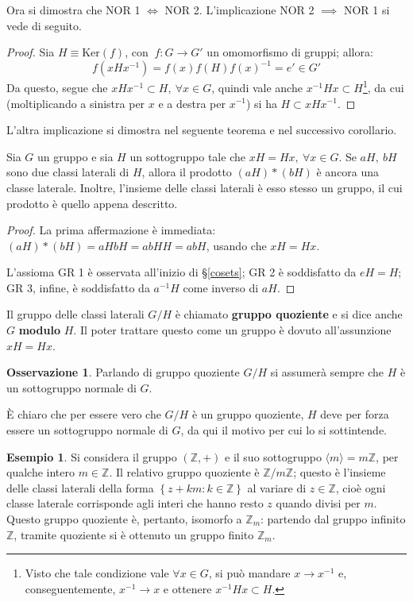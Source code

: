 \documentclass[11pt, a4paper]{scrartcl}
\theoremstyle{definition}
\newtheorem{esempio}{Esempio}
\numberwithin{esempio}{section}
\theoremstyle{definition}
\newtheorem{obs}{Osservazione}
\numberwithin{obs}{section}
\numberwithin{nota}{section}
\numberwithin{equation}{subsection}
\begin{document}
Ora si dimostra che NOR 1 $\iff$ NOR 2. L'implicazione NOR 2 $\implies$ NOR 1 si vede di seguito.
\begin{proof}
	Sia $H\equiv \mathrm{Ker} (f)$, con $ \ f: G \to G'$ un omomorfismo di gruppi; allora:
	\[
	f(xHx^{-1} ) = f(x) f(H) f(x) ^{-1} = e' \in G'
	\] 
	Da questo, segue che $x H x^{-1} \subset H, \ \forall x \in G$, quindi vale anche $x^{-1} H x \subset H$\footnote{Visto che tale condizione vale $\forall x \in G$, si pu\`o mandare $x\to x^{-1} $ e, conseguentemente, $x^{-1} \to x$ e ottenere $x^{-1} Hx \subset H$.}, da cui (moltiplicando a sinistra per $x$ e a destra per $x^{-1} $) si ha $H \subset x H x^{-1} $.
\end{proof}
L'altra implicazione si dimostra nel seguente teorema e nel successivo corollario.

\begin{teorema}
	{}{}
	Sia $G$ un gruppo e sia $H$ un sottogruppo tale che $xH = Hx, \ \forall x \in G$. Se $aH, \ bH$ sono due classi laterali di $H$, allora il prodotto $(aH) * (bH) $ \`e ancora una classe laterale. Inoltre, l'insieme delle classi laterali \`e esso stesso un gruppo, il cui prodotto \`e quello appena descritto.

	\begin{proof}
		La prima affermazione \`e immediata: $(aH) * (bH) = aHbH = abHH = abH$, usando che $xH = Hx$.

		L'assioma GR 1 \`e osservata all'inizio di \S \ref{cosets}; GR 2 \`e soddisfatto da $eH = H$; GR 3, infine, \`e soddisfatto da $a^{-1 } H$ come inverso di $aH$.
	\end{proof}
\end{teorema}
\noindent Il gruppo delle classi laterali $G / H$ \`e chiamato \textbf{gruppo quoziente} e si dice anche $G$ \textbf{modulo} $H$. 
Il poter trattare questo come un gruppo \`e dovuto all'assunzione $xH = Hx$.
\begin{obs}
	Parlando di gruppo quoziente $G / H$ si assumer\`a sempre che $H$ \`e un sottogruppo normale di $G$.

	\`E chiaro che per essere vero che $G / H$ \`e un gruppo quoziente, $H$ deve per forza essere un sottogruppo normale di $G$, da qui il motivo per cui lo si sottintende.
\end{obs}
\begin{esempio}
Si considera il gruppo $(\mathbb{Z},+)$ e il suo sottogruppo $ \langle m \rangle=m\mathbb{Z}$, per qualche intero $m \in \mathbb{Z}$.
Il relativo gruppo quoziente \`e $\mathbb{Z} / m\mathbb{Z}$; questo \`e l'insieme delle classi laterali della forma $\left\{ z+km:k \in \mathbb{Z} \right\} $ al variare di $z \in \mathbb{Z}$, cio\`e ogni classe laterale corrisponde agli interi che hanno resto $z$ quando divisi per $m$.
Questo gruppo quoziente \`e, pertanto, isomorfo a $\mathbb{Z}_m$: partendo dal gruppo infinito $\mathbb{Z}$, tramite quoziente si \`e ottenuto un gruppo finito $\mathbb{Z}_m$.
\end{esempio}
\end{document}
